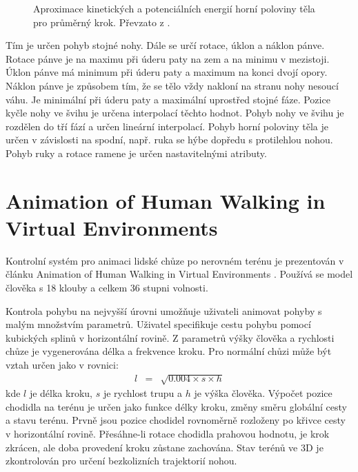 \begin{figure}[h]
\begin{center}
\caption{Aproximace kinetických a potenciálních energií horní poloviny těla pro průměrný krok. Převzato z \cite{bruderlin}.} \label{bruderlin_img}
\end{center}
\end{figure}

Tím je určen pohyb stojné nohy. Dále se určí rotace, úklon a náklon pánve. Rotace pánve je na maximu při úderu paty na zem a na minimu v mezistoji. Úklon pánve má minimum při úderu paty a maximum na konci dvojí opory. Náklon pánve je způsobem tím, že se tělo vždy nakloní na stranu nohy nesoucí váhu. Je minimální při úderu paty a maximální uprostřed stojné fáze. Pozice kyčle nohy ve švihu je určena interpolací těchto hodnot. Pohyb nohy ve švihu je rozdělen do tří fází a určen lineární interpolací. Pohyb horní poloviny těla je určen v závislosti na spodní, např. ruka se hýbe dopředu s protilehlou nohou. Pohyb ruky a rotace ramene je určen nastavitelnými atributy.

\section{Animation of Human Walking in Virtual Environments}
Kontrolní systém pro animaci lidské chůze po nerovném terénu je prezentován v článku Animation of Human Walking in Virtual Environments \cite{chung}. Používá se model člověka s 18 klouby a celkem 36 stupni volnosti. 

Kontrola pohybu na nejvyšší úrovni umožňuje uživateli animovat pohyby s malým množstvím parametrů. Uživatel specifikuje cestu pohybu pomocí kubických splinů v horizontální rovině. Z parametrů výšky člověka a rychlosti chůze je vygenerována délka a frekvence kroku. Pro normální chůzi může být vztah určen jako v rovnici:
\begin{eqnarray}
l &=& \sqrt{0.004 \times s \times h}\label{r.step_length}
\end{eqnarray}
kde $l$ je délka kroku, $s$ je rychlost trupu a $h$ je výška člověka.
Výpočet pozice chodidla na terénu je určen jako funkce délky kroku, změny směru globální cesty a stavu terénu. Prvně jsou pozice chodidel rovnoměrně rozloženy po křivce cesty v horizontální rovině. Přesáhne-li rotace chodidla prahovou hodnotu, je krok zkrácen, ale doba provedení kroku zůstane zachována. Stav terénů ve 3D je zkontrolován pro určení bezkolizních trajektorií nohou. 

